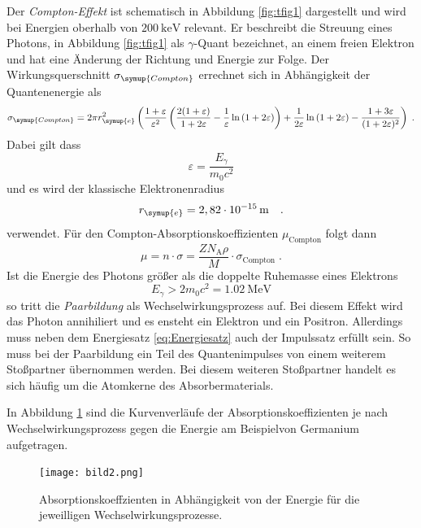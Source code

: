 Der \textit{Compton-Effekt} ist schematisch in Abbildung \ref{fig:tfig1} dargestellt und wird bei Energien oberhalb von $\SI{200}{\keV}$ relevant.
Er beschreibt die Streuung eines Photons, in Abbildung \ref{fig:tfig1} als $\gamma$-Quant bezeichnet, an einem freien Elektron und hat eine Änderung der Richtung und Energie zur Folge.
Der Wirkungsquerschnitt $\sigma_{\symup{Compton}}$ errechnet sich in Abhängigkeit der Quantenenergie als
\begin{equation}
    \label{eq:sigmacompton}
\sigma_{\symup{Compton}}=2\pi r_{\symup{e}}^2\left(\frac{1+\varepsilon}{\varepsilon^2}\left(\frac{2(1+\varepsilon)}{1+2\varepsilon}-\frac{1}{\varepsilon}\ln{(1+2\varepsilon)}\right)+\frac{1}{2\varepsilon}\ln{(1+2\varepsilon)}-\frac{1+3\varepsilon}{(1+2\varepsilon)^2}\right) \; .
\end{equation}
Dabei gilt dass 
\begin{equation}
\varepsilon=\frac{E_{\gamma}}{m_0 c^2}
\end{equation}
und es wird der klassische Elektronenradius
\begin{equation}
r_{\symup{e}}=2,82\cdot 10^{-15}\,\si{\m}\quad .
\end{equation}
verwendet.
Für den Compton-Absorptionskoeffizienten $\mu_\text{Compton}$ folgt dann
\begin{equation}
    \label{eq:mucompton}
    \mu =n \cdot \sigma = \frac{Z N_\text{A} \rho }{M} \cdot \sigma_\text{Compton} \;.
\end{equation}
Ist die Energie des Photons größer als die doppelte Ruhemasse eines Elektrons 
\begin{equation} \label{eq:Energiesatz}
E_{\gamma}>2m_0c^2=\SI{1,02}{\MeV}
\end{equation}
so tritt die \textit{Paarbildung} als Wechselwirkungsprozess auf.
Bei diesem Effekt wird das Photon annihiliert und es ensteht ein Elektron
und ein Positron. Allerdings muss neben dem Energiesatz \ref{eq:Energiesatz} auch der Impulssatz erfüllt sein. So muss bei der Paarbildung
ein Teil des Quantenimpulses von einem weiterem Stoßpartner übernommen werden. Bei diesem weiteren Stoßpartner handelt es sich häufig um  die Atomkerne
des Absorbermaterials.

In Abbildung \ref{fig:tfig2} sind die Kurvenverläufe der Absorptionskoeffizienten je nach Wechselwirkungsprozess gegen die Energie am Beispielvon Germanium aufgetragen.

\FloatBarrier
\begin{figure}[h]
    \centering
    \texttt{[image: bild2.png]}
    \caption{Absorptionskoeffzienten in Abhängigkeit von der Energie für die jeweilligen Wechselwirkungsprozesse. \cite{quelle01}}
    \label{fig:tfig2}
\end{figure}
\FloatBarrier
\noindent

